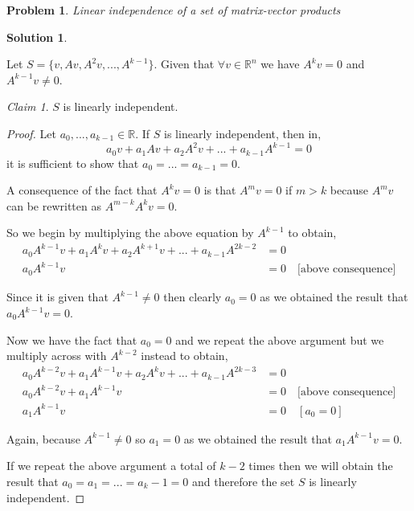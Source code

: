 \documentclass{article}
\newtheorem{problem}{Problem}
\theoremstyle{definition}
\newtheorem*{solution}{Solution}
\theoremstyle{remark}
\newtheorem*{theorem}{Claim}
\begin{document}
\begin{problem}

Linear independence of a set of matrix-vector products

\end{problem}

\begin{solution}

\end{solution}

Let $S=\{v,Av,A^2v,...,A^{k-1}\}$.
Given that $\forall v\in \mathbb{R}^n$ we have $A^kv=0$ and $A^{k-1}v\neq 0$.

\begin{theorem}
$S$ is linearly independent.
\end{theorem}
\begin{proof}
Let $a_0,...,a_{k-1}\in \mathbb{R}$.
If $S$ is linearly independent, then in,
\[a_0v+a_1Av+a_2A^2v+...+a_{k-1}A^{k-1}=0\]
it is sufficient to show that $a_0=...=a_{k-1}=0$.

A consequence of the fact that $A^kv=0$ is that $A^mv=0$ if $m>k$ because $A^mv$ can be rewritten as $A^{m-k}A^kv=0$.

So we begin by multiplying the above equation by $A^{k-1}$ to obtain,
\begin{align*}
a_0A^{k-1}v+a_1A^kv+a_2A^{k+1}v+...+a_{k-1}A^{2k-2} & = 0 \\
a_0A^{k-1}v & = 0 \quad \text{[above consequence]}
\end{align*}

Since it is given that $A^{k-1}\neq 0$ then clearly $a_0=0$ as we obtained the result that $a_0A^{k-1}v = 0$.

Now we have the fact that $a_0=0$ and we repeat the above argument but we multiply across with $A^{k-2}$ instead to obtain,
\begin{align*}
a_0A^{k-2}v+a_1A^{k-1}v+a_2A^kv+...+a_{k-1}A^{2k-3} & = 0 \\
a_0A^{k-2}v+a_1A^{k-1}v & = 0 \quad \text{[above consequence]} \\
a_1A^{k-1}v & = 0 \quad [a_0=0]
\end{align*}

Again, because $A^{k-1}\neq 0$ so $a_1=0$ as we obtained the result that $a_1A^{k-1}v = 0$.

If we repeat the above argument a total of $k-2$ times then we will obtain the result that $a_0=a_1=...=a_k-1=0$ and therefore the set $S$ is linearly independent.

\end{proof}
\end{document}
